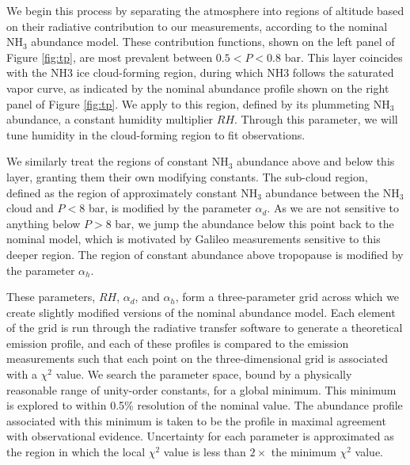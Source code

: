 \documentclass{article}
\begin{document}
	We begin this process by separating the atmosphere into regions of altitude based on their radiative contribution to our measurements, according to the nominal NH$_{3}$ abundance model.
	These contribution functions, shown on the left panel of Figure \ref{fig:tp}, are most prevalent between $0.5 < P < 0.8$ bar.
	This layer coincides with the NH3 ice cloud-forming region, during which NH3 follows the saturated vapor curve, as indicated by the nominal abundance profile shown on the right panel of Figure \ref{fig:tp}.
	We apply to this region, defined by its plummeting NH$_{3}$ abundance, a constant humidity multiplier $RH$.
	Through this parameter, we will tune humidity in the cloud-forming region to fit observations.

	We similarly treat the regions of constant NH$_{3}$ abundance above and below this layer, granting them their own modifying constants.
	The sub-cloud region, defined as the region of approximately constant NH$_{3}$ abundance between the NH$_{3}$ cloud and $P < 8$ bar, is modified by the parameter $\alpha_{d}$.
	As we are not sensitive to anything below $P > 8$ bar, we jump the abundance below this point back to the nominal model, which is motivated by Galileo measurements sensitive to this deeper region.
	The region of constant abundance above tropopause is modified by the parameter $\alpha_{h}$.

	These parameters, $RH$, $\alpha_{d}$, and $\alpha_{h}$, form a three-parameter grid across which we create slightly modified versions of the nominal abundance model.
	Each element of the grid is run through the radiative transfer software to generate a theoretical emission profile, and each of these profiles is compared to the emission measurements such that each point on the three-dimensional grid is associated with a $\chi^{2}$ value.
	We search the parameter space, bound by a physically reasonable range of unity-order constants, for a global minimum. This minimum is explored to within 0.5\% resolution of the nominal value.
	The abundance profile associated with this minimum is taken to be the profile in maximal agreement with observational evidence. Uncertainty for each parameter is approximated as the region in which the local $\chi^{2}$ value is less than $2\times$ the minimum $\chi^{2}$ value.
\end{document}
